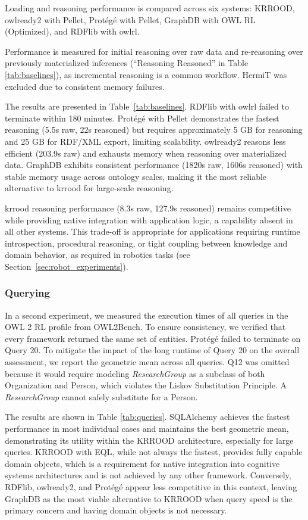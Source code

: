 \documentclass{article}
\begin{document}
Loading and reasoning performance is compared  across six systems: KRROOD, owlready2 with Pellet, Protégé with Pellet, GraphDB with OWL RL (Optimized), and RDFlib with owlrl.

Performance is measured for initial reasoning over raw data and re-reasoning over previously materialized inferences (``Reasoning Reasoned'' in Table \ref{tab:baselines}), as incremental reasoning is a common workflow. HermiT was excluded due to consistent memory failures. 

The results are presented in Table~\ref{tab:baselines}. RDFlib with owlrl failed to terminate within 180 minutes. Protégé with Pellet demonstrates the fastest reasoning (5.5s raw, 22s reasoned) but requires approximately 5 GB for reasoning and 25 GB for RDF/XML export, limiting scalability. owlready2 reasons less efficient (203.9s raw) and exhausts memory when reasoning over materialized data. GraphDB exhibits consistent performance (1820s raw, 1606s reasoned) with stable memory usage across ontology scales, making it the most reliable alternative to \ac{krrood} for large-scale reasoning.

\ac{krrood} reasoning performance (8.3s raw, 127.9s reasoned) remains competitive while providing native integration with application logic, a capability absent in all other systems. This trade-off is appropriate for applications requiring runtime introspection, procedural reasoning, or tight coupling between knowledge and domain behavior, as required in robotics tasks (see Section~\ref{sec:robot_experiments}).

\subsubsection{Querying}

In a second experiment, we measured the execution times of all queries in the OWL 2 RL profile from OWL2Bench. To ensure consistency, we verified that every framework returned the same set of entities. Protégé failed to terminate on Query 20. To mitigate the impact of the long runtime of Query 20 on the overall assessment, we report the geometric mean across all queries. Q12 was omitted because it would require modeling \textit{ResearchGroup} as a subclass of both Organization and Person, which violates the Liskov Substitution Principle. A \textit{ResearchGroup} cannot safely substitute for a Person.

The results are shown in Table \ref{tab:queries}. SQLAlchemy achieves the fastest performance in most individual cases and maintains the best geometric mean, demonstrating its utility within the KRROOD architecture, especially for large queries. KRROOD with EQL, while not always the fastest, provides fully capable domain objects, which is a requirement for native integration into cognitive systems architectures and is not achieved by any other framework. Conversely, RDFlib, owlready2, and Protégé appear less competitive in this context, leaving GraphDB as the most viable alternative to KRROOD when query speed is the primary concern and having domain objects is not necessary.
\end{document}
